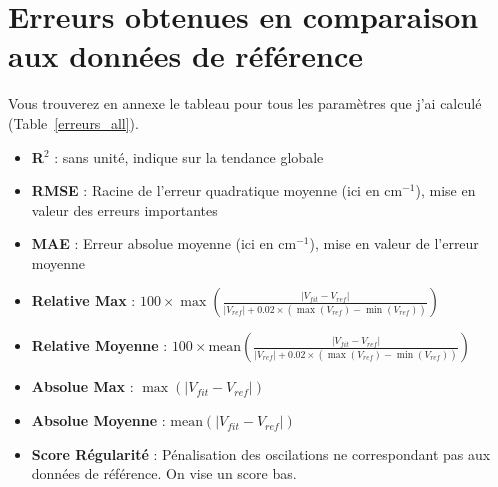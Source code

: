 \documentclass[10pt,a4paper]{article}
\begin{document}
\newpage{}
\section{Erreurs obtenues en comparaison aux données de référence}

\begin{table}[ht]
\centering
\caption{Erreurs globales}
\label{erreurs_global}
\end{table}

Vous trouverez en annexe le tableau pour tous les paramètres que j'ai calculé (Table~\ref{erreurs_all}). \\


\begin{itemize}
  \item \textbf{R$^2$} : sans unité, indique sur la tendance globale
  \item \textbf{RMSE} : Racine de l’erreur quadratique moyenne (ici en cm$^{-1}$), mise
    en valeur des erreurs importantes
  \item \textbf{MAE} : Erreur absolue moyenne (ici en cm$^{-1}$), mise en
    valeur de l'erreur moyenne
  \item \textbf{Relative Max} : $100\times\max(\frac{|V_{fit}-V_{ref}|}{|V_{ref}|+ 0.02\times(\max(V_{ref})-\min(V_{ref}))})$
  \item \textbf{Relative Moyenne} : $100\times\text{mean}(\frac{|V_{fit}-V_{ref}|}{|V_{ref}|+ 0.02\times(\max(V_{ref})-\min(V_{ref}))})$
  \item \textbf{Absolue Max} : $\max(|V_{fit}-V_{ref}|)$
  \item \textbf{Absolue Moyenne} : $\text{mean}(|V_{fit}-V_{ref}|)$
  \item \textbf{Score Régularité} : Pénalisation des oscilations ne correspondant pas aux données de référence. 
    On vise un score bas.
\end{itemize}
\end{document}
